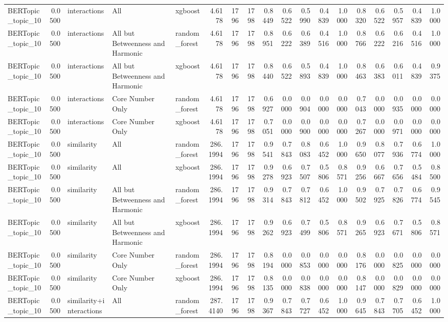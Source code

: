 \begin{tabular}{lrlllrrrrrrrrrrrrr}
BERTopic_topic_10 & 0.0500 & interactions & All & xgboost & 4.6178 & 1796 & 1798 & 0.8449 & 0.6522 & 0.5990 & 0.4839 & 1.0000 & 0.8320 & 0.6522 & 0.5957 & 0.4839 & 1.0000 \\
BERTopic_topic_10 & 0.0500 & interactions & All but Betweenness and Harmonic & random_forest & 4.6178 & 1796 & 1798 & 0.8951 & 0.6222 & 0.6389 & 0.4516 & 1.0000 & 0.8766 & 0.6222 & 0.6216 & 0.4516 & 1.0000 \\
BERTopic_topic_10 & 0.0500 & interactions & All but Betweenness and Harmonic & xgboost & 4.6178 & 1796 & 1798 & 0.8440 & 0.6522 & 0.5893 & 0.4839 & 1.0000 & 0.8463 & 0.6383 & 0.6011 & 0.4839 & 0.9375 \\
BERTopic_topic_10 & 0.0500 & interactions & Core Number Only & random_forest & 4.6178 & 1796 & 1798 & 0.6927 & 0.0000 & 0.0904 & 0.0000 & 0.0000 & 0.7043 & 0.0000 & 0.0935 & 0.0000 & 0.0000 \\
BERTopic_topic_10 & 0.0500 & interactions & Core Number Only & xgboost & 4.6178 & 1796 & 1798 & 0.7051 & 0.0000 & 0.0900 & 0.0000 & 0.0000 & 0.7267 & 0.0000 & 0.0971 & 0.0000 & 0.0000 \\
BERTopic_topic_10 & 0.0500 & similarity & All & random_forest & 286.1994 & 1796 & 1798 & 0.9541 & 0.7843 & 0.8083 & 0.6452 & 1.0000 & 0.9650 & 0.8077 & 0.7936 & 0.6774 & 1.0000 \\
BERTopic_topic_10 & 0.0500 & similarity & All & xgboost & 286.1994 & 1796 & 1798 & 0.9278 & 0.6923 & 0.7507 & 0.5806 & 0.8571 & 0.9256 & 0.6667 & 0.7656 & 0.5484 & 0.8500 \\
BERTopic_topic_10 & 0.0500 & similarity & All but Betweenness and Harmonic & random_forest & 286.1994 & 1796 & 1798 & 0.9314 & 0.7843 & 0.7812 & 0.6452 & 1.0000 & 0.9502 & 0.7925 & 0.7826 & 0.6774 & 0.9545 \\
BERTopic_topic_10 & 0.0500 & similarity & All but Betweenness and Harmonic & xgboost & 286.1994 & 1796 & 1798 & 0.9262 & 0.6923 & 0.7499 & 0.5806 & 0.8571 & 0.9265 & 0.6923 & 0.7671 & 0.5806 & 0.8571 \\
BERTopic_topic_10 & 0.0500 & similarity & Core Number Only & random_forest & 286.1994 & 1796 & 1798 & 0.8194 & 0.0000 & 0.0853 & 0.0000 & 0.0000 & 0.8176 & 0.0000 & 0.0825 & 0.0000 & 0.0000 \\
BERTopic_topic_10 & 0.0500 & similarity & Core Number Only & xgboost & 286.1994 & 1796 & 1798 & 0.8135 & 0.0000 & 0.0838 & 0.0000 & 0.0000 & 0.8147 & 0.0000 & 0.0829 & 0.0000 & 0.0000 \\
BERTopic_topic_10 & 0.0500 & similarity+interactions & All & random_forest & 287.4140 & 1796 & 1798 & 0.9367 & 0.7843 & 0.7727 & 0.6452 & 1.0000 & 0.9645 & 0.7843 & 0.7705 & 0.6452 & 1.0000 \\

\end{tabular}
